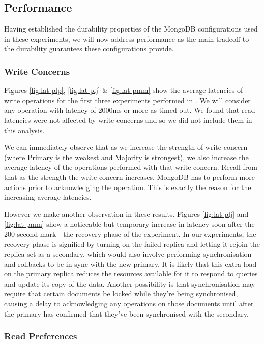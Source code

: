 \subsection{Performance}

Having established the durability properties of the MongoDB configurations used in these experiments, we will now address performance as the main tradeoff to the durability guarantees these configurations provide. 

\subsubsection{Write Concerns}

Figures \ref{fig:lat-plp}, \ref{fig:lat-plj} \& \ref{fig:lat-pmm} show the average latencies of write operations for the first three experiments performed in  . We will consider any operation with latency of 2000ms or more as timed out. We found that read latencies were not affected by write concerns and so we did not include them in this analysis.

We can immediately observe that as we increase the strength of write concern (where Primary is the weakest and Majority is strongest), we also increase the average latency of the operations performed with that write concern. Recall from  that as the strength the write concern increases, MongoDB has to perform more actions prior to acknowledging the operation. This is exactly the reason for the increasing average latencies.

However we make another observation in these results. Figures \ref{fig:lat-plj} and \ref{fig:lat-pmm} show a noticeable but temporary increase in latency soon after the 200 second mark - the recovery phase of the experiment. In our experiments, the recovery phase is signified by turning on the failed replica and letting it rejoin the replica set as a secondary, which would also involve performing synchronisation and rollbacks to be in sync with the new primary. It is likely that this extra load on the primary replica reduces the resources available for it to respond to queries and update its copy of the data. Another possibility is that synchronisation may require that certain documents be locked while they're being synchronised, causing a delay to acknowledging any operations on those documents until after the primary has confirmed that they've been synchronised with the secondary. 

\subsubsection{Read Preferences}

